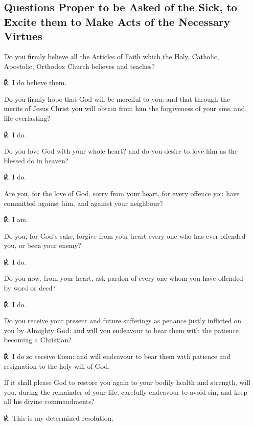 \subsection{Questions Proper to be Asked of the Sick, to Excite them to Make Acts of the Necessary Virtues}
\noindent
Do you firmly believe all the Articles of Faith which the Holy, Catholic, Apostolic, Orthodox Church believes and teaches?\par
℟. I do believe them.\par\noindent
Do you firmly hope that God will be merciful to you: and that through the merits of Jesus Christ you will obtain from him the forgiveness of your sins, and life everlasting?\par
℟. I do.\par\noindent
Do you love God with your whole heart? and do you desire to love him as the blessed do in heaven?\par
℟. I do.\par\noindent
Are you, for the love of God, sorry from your heart, for every offence you have committed against him, and against your neighbour?\par
℟. I am.\par\noindent
Do you, for God's sake, forgive from your heart every one who has ever offended you, or been your enemy?\par
℟. I do.\par\noindent
Do you now, from your heart, ask pardon of every one whom you have offended by word or deed?\par
℟. I do.\par\noindent
Do you receive your present and future sufferings as penance justly inflicted on you by Almighty God; and will you endeavour to bear them with the patience becoming a Christian?\par
℟. I do so receive them: and will endeavour to bear them with patience and resignation to the holy will of God.\par\noindent
If it shall please God to restore you again to your bodily health and strength, will you, during the remainder of your life, carefully endeavour to avoid sin, and keep all his divine commandments?\par
℟. This is my determined resolution.\par
